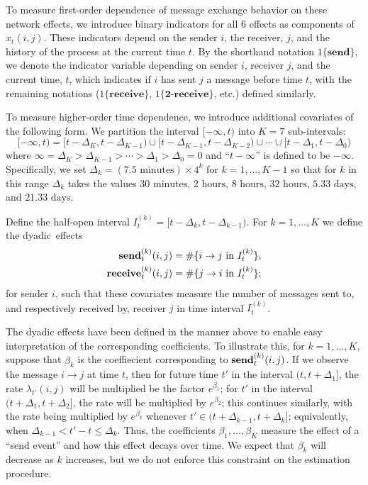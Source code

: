 \documentclass[final]{statsoc}
\begin{document}
To measure first-order dependence of message exchange behavior on these network effects, we introduce binary
indicators for all $6$ effects as components of $x_t(i,j)$.  These indicators
depend on the sender $i$, the receiver, $j$, and the history of the process at
the current time $t$.  By the shorthand notation $1\{\textbf{send}\}$, we denote
the indicator variable depending on sender $i$, receiver $j$, and the current
time, $t$,  which indicates if $i$ has sent $j$ a message before time $t$, with the remaining notations ($1\{\textbf{receive}\}$, $1\{\textbf{2-receive}\}$, etc.)
defined similarly.

To measure higher-order time dependence, we introduce additional covariates of the following form.  We partition the interval $[-\infty, t)$ into $K = 7$ sub-intervals:
\[
  [-\infty, t) =
  [t - \Delta_K, t - \Delta_{K-1}) \cup [t - \Delta_{K-1}, t - \Delta_{K-2}) \cup \dotsb \cup [t - \Delta_1, t - \Delta_0)
\]
where $\infty = \Delta_K > \Delta_{K-1} > \dotsb > \Delta_1 > \Delta_0 = 0$
and ``$t - \infty$'' is defined to be $-\infty$.  Specifically, we set
$\Delta_k = (7.5\text{ minutes}) \times 4^k$ for $k = 1, \dotsc, K-1$ so that
for $k$ in this range $\Delta_k$ takes the values $30\text{ minutes}$,
$2\text{ hours}$, $8\text{ hours}$, $32\text{ hours}$, $5.33\text{ days}$, and
$21.33\text{ days}$.

Define the half-open interval $I_{t}^{(k)} = [t - \Delta_k, t -
\Delta_{k-1})$.  For $k = 1, \dotsc, K$ we define the dyadic~effects
\begin{align*}
  \text{\textbf{send}}^{(k)}_t(i,j)
    &= \#\{ i \to j \text{ in } I_t^{(k)} \}, \\
  \text{\textbf{receive}}^{(k)}_t(i,j)
    &= \#\{ j \to i \text{ in } I_t^{(k)} \};
\end{align*}
for sender $i$, such that these covariates measure the number of messages sent to, and respectively received by, receiver $j$ in time interval $I_t^{(k)}$.

The dyadic effects have been defined in the manner above to enable easy interpretation of
the corresponding coefficients.  To illustrate this, for $k = 1, \dotsc, K$,
suppose that $\beta_{k}$ is the coeffiecient corresponding to
$\text{\textbf{send}}^{(k)}_t(i,j)$.  If we observe the message $i \to j$ at
time $t$, then for future time $t'$ in the interval $(t, t + \Delta_1]$, the
rate $\lambda_{t'}(i,j)$ will be multiplied be the factor $e^{\beta_{1}}$; for
$t'$ in the interval $(t + \Delta_1, t + \Delta_2]$, the rate will be
multiplied by $e^{\beta_{2}}$; this continues similarly, with the rate being
multiplied by $e^{\beta_{k}}$ whenever $t' \in (t + \Delta_{k-1}, t +
\Delta_{k}]$; equivalently, when $\Delta_{k-1} < t' - t \leq \Delta_k$.  Thus,
the coefficients $\beta_{1}, \dotsc, \beta_{K}$ measure the effect of a ``send
event'' and how this effect decays over time.  We expect that $\beta_{k}$ will
decrease as $k$ increases, but we do not enforce this constraint on the
estimation procedure.
\end{document}
